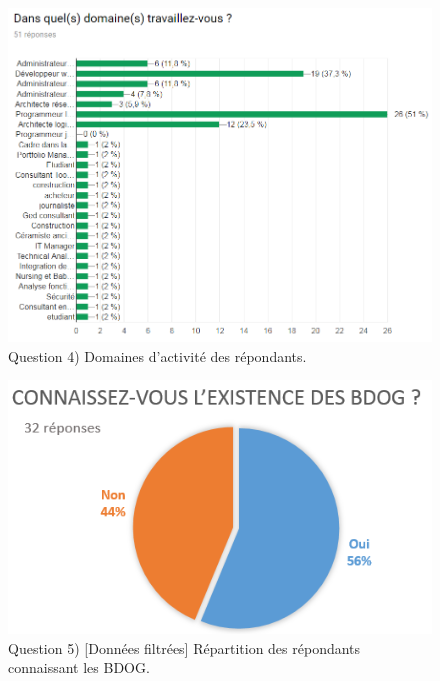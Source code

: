 \documentclass[a4paper,fleqn,12pt,oneside]{report}
\begin{document}
\begin{figure}[!ht]
\centering
\includegraphics[scale=.8]{figures/QProf.png}
\caption{Question 4) Domaines d'activité des répondants.}
\label{fig:QProf}
\end{figure}

\newpage
{}

\begin{figure}[!ht]
\centering
\includegraphics[scale=1]{figures/QExistFilt.png}
\caption{Question 5) [Données filtrées] Répartition des répondants connaissant les BDOG.}
\label{fig:QExistFilt}
\end{figure}
\end{document}
